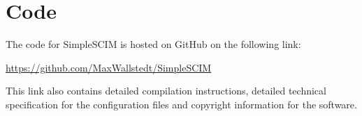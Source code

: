 \documentclass[12pt,twoside,a4paper,titlepage]{article}
\begin{document}
 \newpage

 \appendix

 \section{Code}
 \label{appendix}

 The code for SimpleSCIM is hosted on GitHub on the following link:

 \begin{center}
  \url{https://github.com/MaxWallstedt/SimpleSCIM}
 \end{center}

 \noindent
 This link also contains detailed compilation instructions, detailed
 technical specification for the configuration files and copyright
 information for the software.
\end{document}

